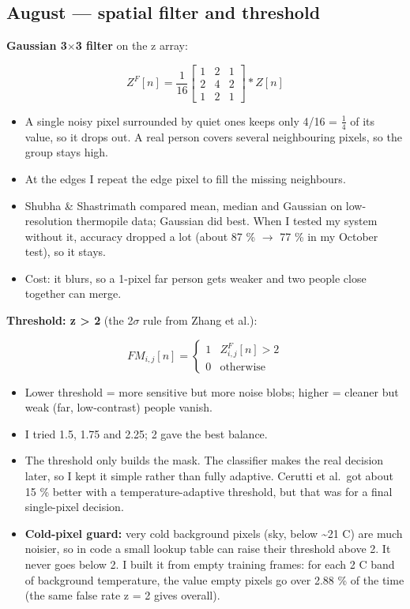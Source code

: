 \documentclass[11pt,a4paper]{article}
\providecommand{\tightlist}{\setlength{\itemsep}{0pt}\setlength{\parskip}{0pt}}
\begin{document}
\hypertarget{august-spatial-filter-and-threshold}{%
\subsection{August --- spatial
filter and
threshold}\label{august-spatial-filter-and-threshold}}

\textbf{Gaussian 3$\times$3 filter}
on the z array:

\[
Z^{F}[n] = \frac{1}{16}\begin{bmatrix}1&2&1\\2&4&2\\1&2&1\end{bmatrix} * Z[n]
\]

\begin{itemize}
\tightlist
\item
  A single noisy pixel
  surrounded by quiet ones
  keeps only 4/16 = $\frac{1}{4}$ of its
  value, so it drops out. A
  real person covers several
  neighbouring pixels, so the
  group stays high.
\item
  At the edges I repeat the
  edge pixel to fill the
  missing neighbours.
\item
  Shubha \& Shastrimath
  compared mean, median and
  Gaussian on low-resolution
  thermopile data; Gaussian
  did best. When I tested my
  system without it, accuracy
  dropped a lot (about 87 \% $\rightarrow$
  77 \% in my October test),
  so it stays.
\item
  Cost: it blurs, so a 1-pixel
  far person gets weaker and
  two people close together
  can merge.
\end{itemize}

\textbf{Threshold: z
\textgreater{} 2} (the 2$\sigma$ rule
from Zhang et al.):

\[
FM_{i,j}[n] = \begin{cases}1 & Z^{F}_{i,j}[n] > 2\\ 0 & \text{otherwise}\end{cases}
\]

\begin{itemize}
\tightlist
\item
  Lower threshold = more
  sensitive but more noise
  blobs; higher = cleaner but
  weak (far, low-contrast)
  people vanish.
\item
  I tried 1.5, 1.75 and 2.25;
  2 gave the best balance.
\item
  The threshold only builds
  the mask. The classifier
  makes the real decision
  later, so I kept it simple
  rather than fully adaptive.
  Cerutti et al.~got about 15
  \% better with a
  temperature-adaptive
  threshold, but that was for
  a final single-pixel
  decision.
\item
  \textbf{Cold-pixel guard:}
  very cold background pixels
  (sky, below
  \textasciitilde21 \textdegree{}C) are
  much noisier, so in code a
  small lookup table can raise
  their threshold above 2. It
  never goes below 2. I built
  it from empty training
  frames: for each 2 \textdegree{}C band
  of background temperature,
  the value empty pixels go
  over 2.88 \% of the time
  (the same false rate z = 2
  gives overall).
\end{itemize}
\end{document}
